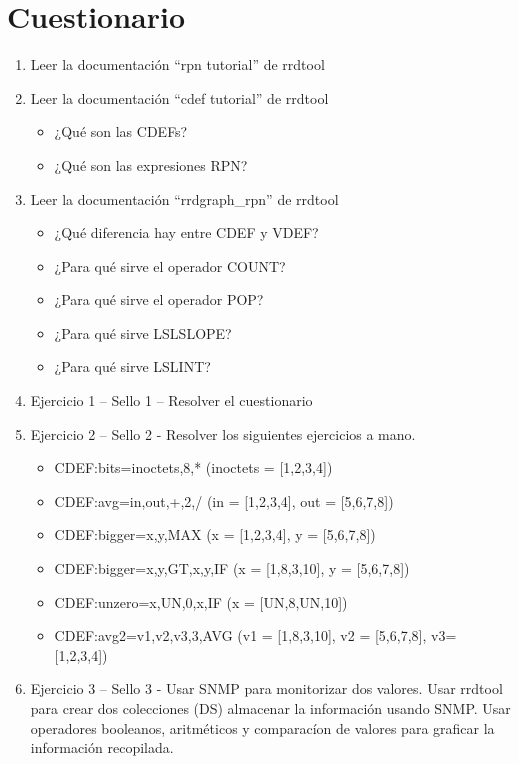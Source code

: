 \chapter{Cuestionario}
\begin{enumerate}
	\item Leer la documentación “rpn tutorial” de rrdtool
	\item Leer la documentación “cdef tutorial” de rrdtool
	\begin{itemize}
		\item ¿Qué son las CDEFs?
		\item ¿Qué son las expresiones RPN?
	\end{itemize}
	\item Leer la documentación  “rrdgraph\_rpn” de rrdtool
	\begin{itemize}
		\item ¿Qué diferencia hay entre CDEF y VDEF?
		\item ¿Para qué sirve el operador COUNT?
		\item ¿Para qué sirve el operador POP?
		\item ¿Para qué sirve LSLSLOPE?
		\item ¿Para qué sirve LSLINT?
	\end{itemize}
	\item Ejercicio 1 – Sello 1 – Resolver el cuestionario
	\item Ejercicio 2 – Sello 2 - Resolver los siguientes ejercicios a mano.
	\begin{itemize}
		\item CDEF:bits=inoctets,8,* (inoctets = [1,2,3,4])
		\item CDEF:avg=in,out,+,2,/ (in = [1,2,3,4], out = [5,6,7,8])
		\item CDEF:bigger=x,y,MAX (x = [1,2,3,4], y = [5,6,7,8])
		\item CDEF:bigger=x,y,GT,x,y,IF (x = [1,8,3,10], y = [5,6,7,8])
		\item CDEF:unzero=x,UN,0,x,IF (x = [UN,8,UN,10])
		\item CDEF:avg2=v1,v2,v3,3,AVG (v1 = [1,8,3,10], v2 = [5,6,7,8], v3= [1,2,3,4])
	\end{itemize}
	\item Ejercicio 3 – Sello 3 -  Usar SNMP para monitorizar dos valores. Usar rrdtool para crear dos colecciones (DS) almacenar la información usando SNMP. Usar operadores booleanos, aritméticos y comparacíon de  valores para graficar la información recopilada.
\end{enumerate}
\noindent
